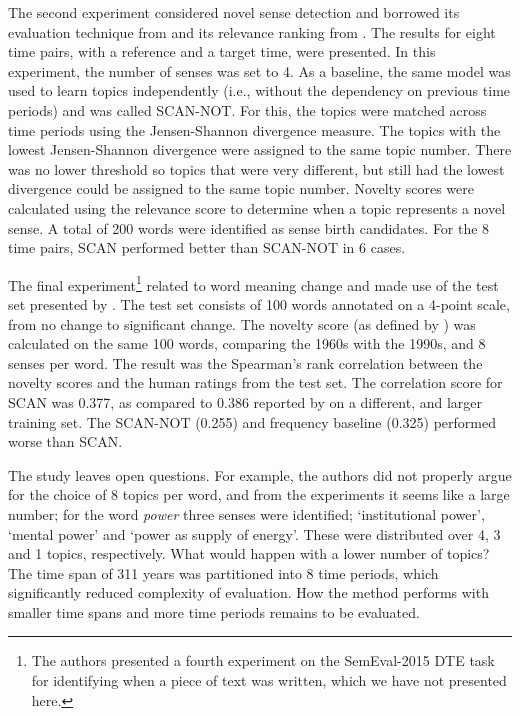 \documentclass[output=paper]{langsci/langscibook}
\begin{document}
The second experiment considered novel sense detection \citep{lau-etal-2012-word}
and borrowed its evaluation technique from \citet{mitra2015automatic} and its relevance ranking from \citet{cook-etal-2014-novel}.  The results for eight time pairs, with a reference and a target time, were presented. 
In this experiment, the number of senses was set to 4. As a baseline, the same model was used to learn topics independently (i.e., without the dependency on previous time periods) and was called SCAN-NOT. For this, the topics were matched across time periods using the Jensen-Shannon divergence measure. The topics with the lowest Jensen-Shannon divergence were assigned to the same topic number. There was no lower threshold so topics that were very different, but still had the lowest divergence could be assigned to the same topic number. 
Novelty scores were calculated using the relevance score to determine when a topic represents a novel sense. A total of 200 words were identified as sense birth candidates. For the 8 time pairs, SCAN performed better than SCAN-NOT in 6 cases.

The final experiment\footnote{The authors presented a fourth experiment on the SemEval-2015 DTE task for identifying when a piece of text was written, which we have not presented here.} related to word meaning change and made use of the test set presented by \citet{gulordava-baroni-2011-distributional}. The test set consists of  100 words annotated on a 4-point scale, from no change to significant change. The novelty score (as defined by \citealp{cook-etal-2014-novel}) was calculated on the same 100 words, comparing the 1960s with the 1990s, and 8 senses per word. The result was the Spearman's rank correlation between the novelty scores and the human ratings from the test set. The correlation score for SCAN was 0.377, as compared to 0.386 reported by \citet{gulordava-baroni-2011-distributional} on a different, and larger training set. The SCAN-NOT (0.255) and frequency baseline (0.325) performed worse than SCAN. 



The study leaves open questions. For example, the authors did not properly argue for the choice of 8 topics per word, and from the experiments it seems like a large number; for the word \emph{power} three senses were identified; `institutional power', `mental power' and `power as supply of energy'. These were distributed over 4, 3 and 1 topics, respectively. What would happen with a lower number of topics? 
The time span of 311 years was partitioned into 8 time periods, which significantly reduced complexity of evaluation. How the method performs with smaller time spans and more time periods remains to be evaluated. 
\end{document}

